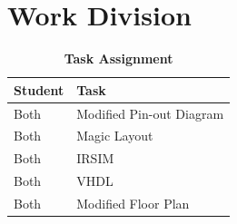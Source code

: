 \documentclass[a4paper]{article}
\begin{document}
\section{\textbf{Work Division}}
    \begin{table}[H]
        \centering
        \begin{tabular}{l | p{8cm}}
            \hline
            \textbf{Student}   & \textbf{Task} \\ \hline
            \midrule
                Both        & Modified Pin-out Diagram \\
                Both        & Magic Layout \\
                Both        & IRSIM \\
                Both        & VHDL \\
                Both        & Modified Floor Plan
        \end{tabular}
        \caption{\textbf{Task Assignment}}
    \end{table}
\end{document}
